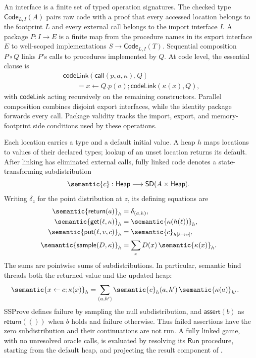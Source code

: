 An interface is a finite set of typed operation signatures.
The checked type
\(\mathsf{Code}_{L,I}(A)\) pairs raw code with a proof that every accessed
location belongs to the footprint \(L\) and every external call belongs to
the import interface \(I\).
A package \(P:I\to E\) is a finite map from the
procedure names in its export interface \(E\) to well-scoped implementations
\(S\to\mathsf{Code}_{L,I}(T)\).
Sequential composition \(P\circ Q\)
links \(P\)'s calls to procedures implemented by \(Q\).
At code level, the
essential clause is
\begin{equation}
\label{eq:ssprove-link}
\begin{aligned}
 &\mathsf{codeLink}(\mathsf{call}(p,a,\kappa),Q)\\
 &\qquad =
 x\leftarrow Q.p(a);
 \mathsf{codeLink}(\kappa(x),Q),
\end{aligned}
\end{equation}
with \(\mathsf{codeLink}\) acting recursively on the remaining constructors.
Parallel composition combines disjoint export interfaces, while the identity
package forwards every call.
Package validity tracks the import, export, and
memory-footprint side conditions used by these operations.

Each location carries a type and a default initial value.
A heap \(h\) maps
locations to values of their declared types; lookup of an unset location
returns its default.
After linking has eliminated external calls, fully linked code denotes a
state-transforming subdistribution
\begin{equation}
\label{eq:ssprove-denotation}
 \semantic{c}:\mathsf{Heap}\longrightarrow
  \mathsf{SD}(A\times\mathsf{Heap}).
\end{equation}
Writing \(\delta_z\) for the point distribution at \(z\), its defining
equations are
\begin{align}
 \semantic{\mathsf{return}(a)}_h
   &=\delta_{(a,h)},\notag\\
 \semantic{\mathsf{get}(\ell,\kappa)}_h
   &=\semantic{\kappa(h(\ell))}_h,\notag\\
 \semantic{\mathsf{put}(\ell,v,c)}_h
   &=\semantic{c}_{h[\ell\mapsto v]},\notag\\
 \semantic{\mathsf{sample}(D,\kappa)}_h
   &=\sum_{x}D(x)\,\semantic{\kappa(x)}_h.
\label{eq:ssprove-effect-semantics}
\end{align}
The sums are pointwise sums of subdistributions.
In particular, semantic
bind threads both the returned value and the updated heap:
\begin{align}
 \semantic{x\leftarrow c;\kappa(x)}_h
 &=
 \sum_{(a,h')}
   \semantic{c}_h(a,h')\,
   \semantic{\kappa(a)}_{h'}.
\label{eq:ssprove-bind-semantics}
\end{align}
SSProve defines failure by sampling the null subdistribution, and
\(\mathsf{assert}(b)\) as \(\mathsf{return}(())\) when \(b\) holds and failure
otherwise.
Thus failed assertions have the zero subdistribution and their
continuations are not run.
A fully linked game, with no unresolved oracle calls, is evaluated by resolving
its \(\mathsf{Run}\) procedure, starting from the default heap, and projecting
the result component of .
